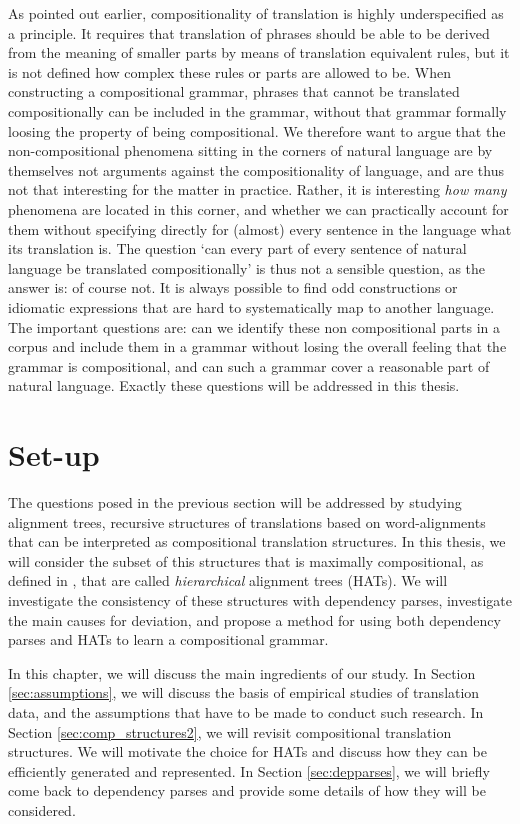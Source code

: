 As pointed out earlier, compositionality  of translation is highly underspecified as a principle. It requires that translation of phrases should be able to be derived from the meaning of smaller parts by means of translation equivalent rules, but it is not defined how complex these rules or parts are allowed to be. When constructing a compositional grammar, phrases that cannot be translated compositionally can be included in the grammar, without that grammar formally loosing the property of being compositional. We therefore want to argue that the non-compositional phenomena sitting in the corners of natural language are by themselves not arguments against the compositionality of language, and are thus not that interesting for the matter in practice. Rather, it is interesting \textit{how many} phenomena are located in this corner, and whether we can practically account for them without specifying directly for (almost) every sentence in the language what its translation is. The question `can every part of every sentence of natural language be translated compositionally' is thus not a sensible question, as the answer is: of course not. It is always possible to find odd constructions or idiomatic expressions that are hard to systematically map to another language. The important questions are: can we identify these non compositional parts in a corpus and include them in a grammar without losing the overall feeling that the grammar is compositional, and can such a grammar cover a reasonable part of natural language. Exactly these questions will be addressed in this thesis.

\section{Set-up}
\label{sec:setup}

The questions posed in the previous section will be addressed by studying alignment trees, recursive structures of translations based on word-alignments that can be interpreted as compositional translation structures. In this thesis, we will consider the subset of this structures that is maximally compositional, as defined in \cite{simaan2013hats}, that are called \textit{hierarchical} alignment trees (HATs). We will investigate the consistency of these structures with dependency parses, investigate the main causes for deviation, and propose a method for using both dependency parses and HATs to learn a compositional grammar.

In this chapter, we will discuss the main ingredients of our study. In Section \ref{sec:assumptions}, we will discuss the basis of empirical studies of translation data, and the assumptions that have to be made to conduct such research. In Section \ref{sec:comp_structures2}, we will revisit compositional translation structures. We will motivate the choice for HATs and discuss how they can be efficiently generated and represented. In Section \ref{sec:depparses}, we will briefly come back to dependency parses and provide some details of how they will be considered.


